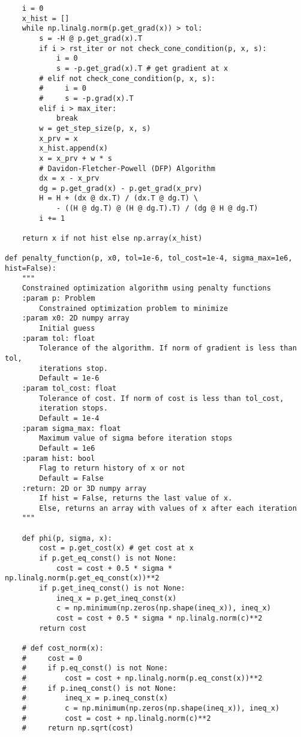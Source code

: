 \begin{lstlisting}
    i = 0
    x_hist = []
    while np.linalg.norm(p.get_grad(x)) > tol:
        s = -H @ p.get_grad(x).T
        if i > rst_iter or not check_cone_condition(p, x, s):
            i = 0
            s = -p.get_grad(x).T # get gradient at x
        # elif not check_cone_condition(p, x, s):
        #     i = 0
        #     s = -p.grad(x).T
        elif i > max_iter:
            break
        w = get_step_size(p, x, s)
        x_prv = x
        x_hist.append(x)
        x = x_prv + w * s
        # Davidon-Fletcher-Powell (DFP) Algorithm
        dx = x - x_prv
        dg = p.get_grad(x) - p.get_grad(x_prv)
        H = H + (dx @ dx.T) / (dx.T @ dg.T) \
            - ((H @ dg.T) @ (H @ dg.T).T) / (dg @ H @ dg.T)
        i += 1

    return x if not hist else np.array(x_hist)

def penalty_function(p, x0, tol=1e-6, tol_cost=1e-4, sigma_max=1e6, hist=False):
    """
    Constrained optimization algorithm using penalty functions
    :param p: Problem
        Constrained optimization problem to minimize
    :param x0: 2D numpy array
        Initial guess
    :param tol: float
        Tolerance of the algorithm. If norm of gradient is less than tol,
        iterations stop.
        Default = 1e-6
    :param tol_cost: float
        Tolerance of cost. If norm of cost is less than tol_cost,
        iteration stops.
        Default = 1e-4
    :param sigma_max: float
        Maximum value of sigma before iteration stops
        Default = 1e6
    :param hist: bool
        Flag to return history of x or not
        Default = False
    :return: 2D or 3D numpy array
        If hist = False, returns the last value of x.
        Else, returns an array with values of x after each iteration
    """

    def phi(p, sigma, x):
        cost = p.get_cost(x) # get cost at x
        if p.get_eq_const() is not None:
            cost = cost + 0.5 * sigma * np.linalg.norm(p.get_eq_const(x))**2
        if p.get_ineq_const() is not None:
            ineq_x = p.get_ineq_const(x)
            c = np.minimum(np.zeros(np.shape(ineq_x)), ineq_x)
            cost = cost + 0.5 * sigma * np.linalg.norm(c)**2
        return cost

    # def cost_norm(x):
    #     cost = 0
    #     if p.eq_const() is not None:
    #         cost = cost + np.linalg.norm(p.eq_const(x))**2
    #     if p.ineq_const() is not None:
    #         ineq_x = p.ineq_const(x)
    #         c = np.minimum(np.zeros(np.shape(ineq_x)), ineq_x)
    #         cost = cost + np.linalg.norm(c)**2
    #     return np.sqrt(cost)


\end{lstlisting}
